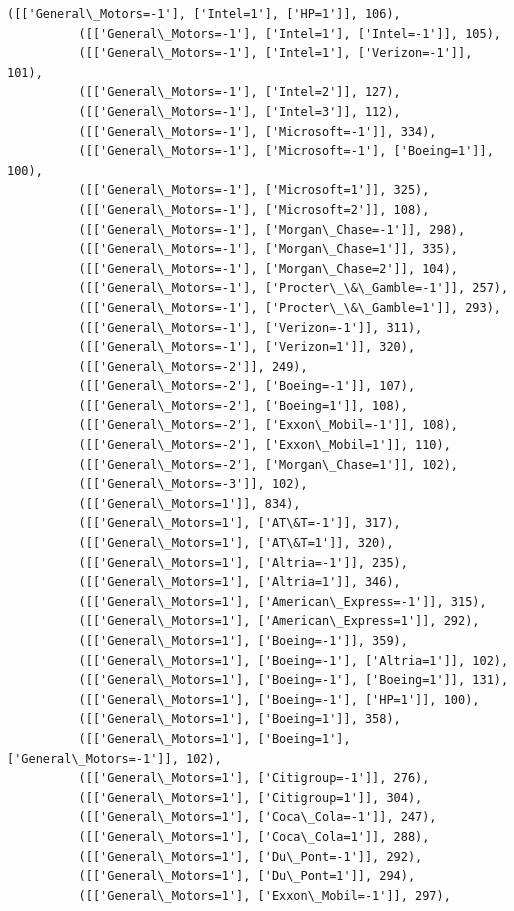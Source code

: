 \documentclass[11pt]{article}
\begin{document}
\begin{Verbatim}[commandchars=\\\{\}]
          ([['General\_Motors=-1'], ['Intel=1'], ['HP=1']], 106),
          ([['General\_Motors=-1'], ['Intel=1'], ['Intel=-1']], 105),
          ([['General\_Motors=-1'], ['Intel=1'], ['Verizon=-1']], 101),
          ([['General\_Motors=-1'], ['Intel=2']], 127),
          ([['General\_Motors=-1'], ['Intel=3']], 112),
          ([['General\_Motors=-1'], ['Microsoft=-1']], 334),
          ([['General\_Motors=-1'], ['Microsoft=-1'], ['Boeing=1']], 100),
          ([['General\_Motors=-1'], ['Microsoft=1']], 325),
          ([['General\_Motors=-1'], ['Microsoft=2']], 108),
          ([['General\_Motors=-1'], ['Morgan\_Chase=-1']], 298),
          ([['General\_Motors=-1'], ['Morgan\_Chase=1']], 335),
          ([['General\_Motors=-1'], ['Morgan\_Chase=2']], 104),
          ([['General\_Motors=-1'], ['Procter\_\&\_Gamble=-1']], 257),
          ([['General\_Motors=-1'], ['Procter\_\&\_Gamble=1']], 293),
          ([['General\_Motors=-1'], ['Verizon=-1']], 311),
          ([['General\_Motors=-1'], ['Verizon=1']], 320),
          ([['General\_Motors=-2']], 249),
          ([['General\_Motors=-2'], ['Boeing=-1']], 107),
          ([['General\_Motors=-2'], ['Boeing=1']], 108),
          ([['General\_Motors=-2'], ['Exxon\_Mobil=-1']], 108),
          ([['General\_Motors=-2'], ['Exxon\_Mobil=1']], 110),
          ([['General\_Motors=-2'], ['Morgan\_Chase=1']], 102),
          ([['General\_Motors=-3']], 102),
          ([['General\_Motors=1']], 834),
          ([['General\_Motors=1'], ['AT\&T=-1']], 317),
          ([['General\_Motors=1'], ['AT\&T=1']], 320),
          ([['General\_Motors=1'], ['Altria=-1']], 235),
          ([['General\_Motors=1'], ['Altria=1']], 346),
          ([['General\_Motors=1'], ['American\_Express=-1']], 315),
          ([['General\_Motors=1'], ['American\_Express=1']], 292),
          ([['General\_Motors=1'], ['Boeing=-1']], 359),
          ([['General\_Motors=1'], ['Boeing=-1'], ['Altria=1']], 102),
          ([['General\_Motors=1'], ['Boeing=-1'], ['Boeing=1']], 131),
          ([['General\_Motors=1'], ['Boeing=-1'], ['HP=1']], 100),
          ([['General\_Motors=1'], ['Boeing=1']], 358),
          ([['General\_Motors=1'], ['Boeing=1'], ['General\_Motors=-1']], 102),
          ([['General\_Motors=1'], ['Citigroup=-1']], 276),
          ([['General\_Motors=1'], ['Citigroup=1']], 304),
          ([['General\_Motors=1'], ['Coca\_Cola=-1']], 247),
          ([['General\_Motors=1'], ['Coca\_Cola=1']], 288),
          ([['General\_Motors=1'], ['Du\_Pont=-1']], 292),
          ([['General\_Motors=1'], ['Du\_Pont=1']], 294),
          ([['General\_Motors=1'], ['Exxon\_Mobil=-1']], 297),

\end{Verbatim}
\end{document}
